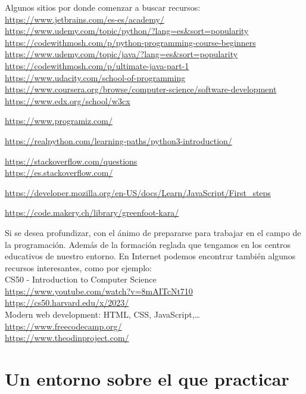 \documentclass[spanish,12pt,a4paper,final,oneside]{book}
\begin{document}
Algunos sitios por donde comenzar a buscar recursos:
\\ \url{https://www.jetbrains.com/es-es/academy/}
\\ \url{https://www.udemy.com/topic/python/?lang=es&sort=popularity}
\\ \url{https://codewithmosh.com/p/python-programming-course-beginners}
\\ \url{https://www.udemy.com/topic/java/?lang=es&sort=popularity}
\\ \url{https://codewithmosh.com/p/ultimate-java-part-1}
\\ \url{https://www.udacity.com/school-of-programming}
\\ \url{https://www.coursera.org/browse/computer-science/software-development}
\\ \url{https://www.edx.org/school/w3cx}

\url{https://www.programiz.com/}

\url{https://realpython.com/learning-paths/python3-introduction/}

\url{https://stackoverflow.com/questions}
\\ \url{https://es.stackoverflow.com/}

\url{https://developer.mozilla.org/en-US/docs/Learn/JavaScript/First_steps}

\url{https://code.makery.ch/library/greenfoot-kara/}


\vspace{1cm}
Si se desea profundizar, con el ánimo de prepararse para trabajar en el campo de la programación. Además de la formación reglada que tengamos en los centros educativos de nuestro entorno. En Internet podemos encontrar también algunos recursos interesantes, como por ejemplo:
\\CS50 - Introduction to Computer Science
\\ \url{https://www.youtube.com/watch?v=8mAITcNt710}
\\ \url{https://cs50.harvard.edu/x/2023/}
\\ Modern web development: HTML, CSS, JavaScript,\ldots
\\ \url{https://www.freecodecamp.org/}
\\ \url{https://www.theodinproject.com/}


\chapter{Un entorno sobre el que practicar}
\end{document}
